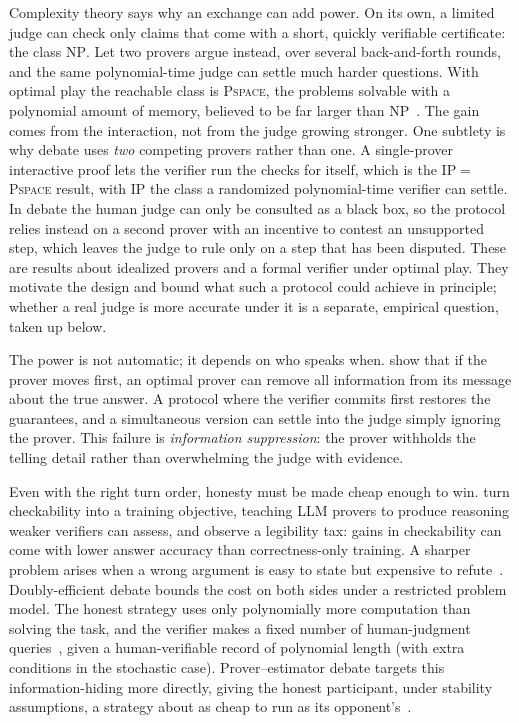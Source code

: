  Complexity theory says why an exchange can add power. On its own, a limited judge can
check only claims that come with a short, quickly verifiable certificate: the class \textsc{NP}. Let two provers argue instead, over several back-and-forth rounds, and the
same polynomial-time judge can settle much harder questions. With optimal play
the reachable class is \textsc{Pspace}, the problems solvable with a
polynomial amount of memory, believed to be far larger than
\textsc{NP}~\citep{Irving2018}. The gain comes
from the interaction, not from the judge growing stronger. One subtlety is why debate
uses \emph{two} competing provers rather than one. A single-prover interactive proof lets the verifier run the checks for itself,
which is the \textsc{IP}$=$\textsc{Pspace} result, with \textsc{IP} the class
a randomized polynomial-time verifier can settle. In debate the human judge can
only be consulted as a black box, so the protocol relies instead on a second prover
with an incentive to contest an unsupported step, which leaves the judge to rule
only on a step that has been disputed. These are results about idealized provers and
a formal verifier under optimal play. They motivate the design and bound what such a
protocol could achieve in principle; whether a real judge is more accurate under it
is a separate, empirical question, taken up below.

 The power is not automatic; it depends on who speaks when. \citet{Anil2021} show that if the prover moves first, an optimal prover can
remove all information from its message about the true answer. A protocol
where the verifier commits first restores the guarantees, and a simultaneous
version can settle into the judge simply ignoring the prover. This failure is \emph{information suppression}: the prover withholds the
telling detail rather than overwhelming the judge with evidence.

Even with the right turn order, honesty must be made cheap enough to win.
\citet{Kirchner2024} turn checkability into a training objective, teaching LLM provers
to produce reasoning weaker verifiers can assess, and observe a legibility tax: gains
in checkability can come with lower answer accuracy than correctness-only training. A
sharper problem arises when a wrong argument is easy to state but expensive to
refute~\citep{BarnesChristiano2020}. Doubly-efficient debate bounds the cost on both sides under a restricted
problem model. The honest strategy uses only polynomially more computation
than solving the task, and the verifier makes a fixed number of human-judgment
queries~\citep{BrownCohen2023}, given a human-verifiable record of polynomial
length (with extra conditions in the stochastic case). Prover--estimator
debate targets this information-hiding more directly, giving the honest participant, under
stability assumptions, a strategy about as cheap to run as its
opponent's~\citep{BrownCohen2025ProverEstimator}.


